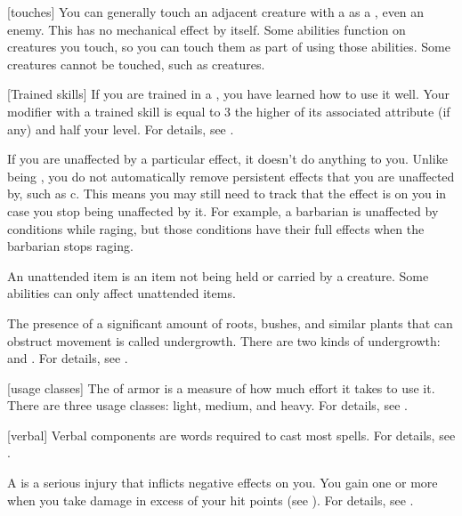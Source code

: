 [touches] You can generally touch an adjacent creature with a  as a , even an enemy.
This has no mechanical effect by itself.
Some abilities function on creatures you touch, so you can touch them as part of using those abilities.
Some creatures cannot be touched, such as  creatures.


[Trained skills] If you are trained in a , you have learned how to use it well.
Your modifier with a trained skill is equal to 3 \add the higher of its associated attribute (if any) and half your level.
For details, see .

 If you are unaffected by a particular effect, it doesn't do anything to you.
Unlike being , you do not automatically remove persistent effects that you are unaffected by, such as c.
This means you may still need to track that the effect is on you in case you stop being unaffected by it.
For example, a barbarian is unaffected by conditions while raging, but those conditions have their full effects when the barbarian stops raging.

 An unattended item is an item not being held or carried by a creature.
Some abilities can only affect unattended items.

 The presence of a significant amount of roots, bushes, and similar plants that can obstruct movement is called undergrowth.
There are two kinds of undergrowth:  and .
For details, see .

[usage classes] The  of armor is a measure of how much effort it takes to use it.
There are three usage classes: light, medium, and heavy.
For details, see .

[verbal] Verbal components are words required to cast most spells.
For details, see .

 A  is a serious injury that inflicts negative effects on you.
You gain one or more  when you take damage in excess of your hit points (see ).
For details, see .

